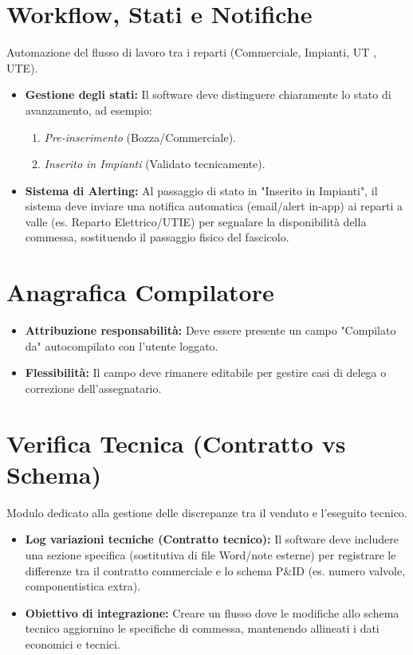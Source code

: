 \documentclass[12pt, a4paper]{article} %
\begin{document}
\section{Workflow, Stati e Notifiche}
Automazione del flusso di lavoro tra i reparti (Commerciale, Impianti, UT ,
UTE).

\begin{itemize} 
    \item \textbf{Gestione degli stati:} Il software deve distinguere chiaramente lo stato di avanzamento, ad esempio:
          \begin{enumerate}
              \item \textit{Pre-inserimento} (Bozza/Commerciale).
              \item \textit{Inserito in Impianti} (Validato tecnicamente).
          \end{enumerate}
    \item \textbf{Sistema di Alerting:} Al passaggio di stato in "Inserito in Impianti", il sistema deve inviare una notifica automatica (email/alert in-app) ai reparti a valle (es. Reparto Elettrico/UTIE) per segnalare la disponibilità della commessa, sostituendo il passaggio fisico del fascicolo.
\end{itemize}

\section{Anagrafica Compilatore}
\begin{itemize}
    \item \textbf{Attribuzione responsabilità:} Deve essere presente un campo "Compilato da" autocompilato con l'utente loggato.
    \item \textbf{Flessibilità:} Il campo deve rimanere editabile per gestire casi di delega o correzione dell'assegnatario.
\end{itemize}

\section{Verifica Tecnica (Contratto vs Schema)}
Modulo dedicato alla gestione delle discrepanze tra il venduto e l'eseguito
tecnico.

\begin{itemize}
    \item \textbf{Log variazioni tecniche (Contratto tecnico):}
          Il software deve includere una sezione specifica (sostitutiva di file Word/note esterne) per registrare le differenze tra il contratto commerciale e lo schema P\&ID (es. numero valvole, componentistica extra).
    \item \textbf{Obiettivo di integrazione:}
          Creare un flusso dove le modifiche allo schema tecnico aggiornino le specifiche di commessa, mantenendo allineati i dati economici e tecnici.
\end{itemize}
\end{document}
